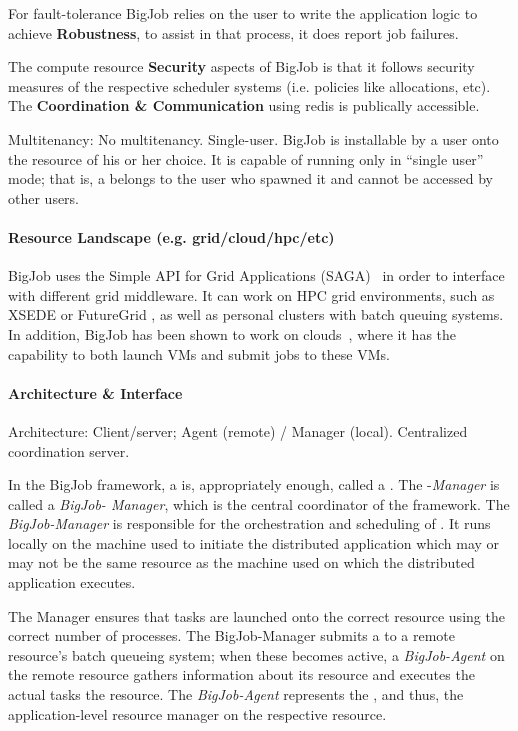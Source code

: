 \documentclass{sig-alternate}
\begin{document}
For fault-tolerance BigJob relies on the user to write the application logic to
achieve \textbf{Robustness}, to assist in that process, it does report job
failures.

The compute resource \textbf{Security} aspects of BigJob is that it follows
security measures of the respective scheduler systems (i.e. policies like
allocations, etc).
The \textbf{Coordination \& Communication} using redis is publically
accessible.

Multitenancy: No multitenancy. Single-user.
BigJob is installable by a user onto the resource of his or her choice. It is capable of
running only in ``single user'' mode; that is, a \pilot belongs to the user who
spawned it and cannot be accessed by other users.

\paragraph{Resource Landscape (e.g. grid/cloud/hpc/etc)}
BigJob uses the Simple API for Grid Applications (SAGA)~\cite{ogf-gfd-90, sagastuff}
in order to interface with different grid middleware. It can work on HPC grid
environments, such as XSEDE or FutureGrid , as well as personal
clusters with batch queuing systems. In addition, BigJob has been shown to work
on clouds~\cite{cpe_pmr_cloud_2012}, where it has the capability to both
launch VMs and submit jobs to these VMs.

\paragraph{Architecture \& Interface}
Architecture: Client/server; Agent (remote) / Manager (local). Centralized coordination server.

In the BigJob framework, a \pilot is, appropriately enough, called a
\pilot. The \pilot-\textit{Manager} is called a \textit{BigJob-
Manager}, which is the central coordinator of the
framework. The \textit{BigJob-Manager} is responsible for
the orchestration and scheduling of \pilots. It runs locally on the
machine used to initiate the distributed application which may or may
not be the same resource as the machine used on which the distributed
application executes.

The Manager ensures that tasks are launched onto the correct resource
using the correct number of processes. The BigJob-Manager submits a
\pilot to a remote resource's batch queueing system; when these
\pilots becomes active, a \textit{BigJob-Agent} on the remote resource
gathers information about its resource
and executes the actual tasks the resource. The \textit{BigJob-Agent}
represents the \pilotjob, and thus, the application-level resource
manager on the respective resource.
\end{document}
